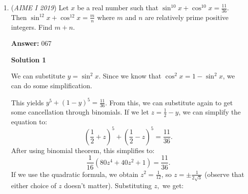 \begin{enumerate}
 Now before we move on to the next few simplification steps, we must remember that $gcd(a,b)$*$lcm(a,b)$=$a*b$.

 \begin{verbatim}
Due to the fact that these log's are in base $10$, this makes the first and second equation equal to $10^{60}$, $10^{570}$ respectively. In this step, we switched the log's into exponential form. Now we multiply both equations to get $x*y$*$(xy)^2$=($x^3$)($y^3$)=$10^{630}$. Now we take the cube root of both sides to get $xy=10^{210}$. 
\end{verbatim}

We've now gotten to the crucial part of this equation. Though this wouldn't pass for full points in a proof-based contest, this is AIME. So, we assume that $x<y$. We also let $x$=$10^a$ and $y$=$10^b$ That means that $gcd(x,y)$ is $x$ and the $lcm(x,y)$ is $y$ due to the fact that we are also assuming that both $x,y$ are $10^a$, $10^b$ respectively. 

 If we put our last few insights together into the first and second equation, we see that $x$=$10^{20}$. We also see that $y$=$10^{190}$. We could check these if wanted (don't worry they work), but if you were very limited on time for this question, just assume these values work and move on. 

 Now $10^{20}$ factors as $2^{20}$*$5^{20}$. This has $40$ prime factors. $2$, $20$ times and $5$, $20$ times. $10^{190}$ factors as $2^{190}$*$5^{190}$. This has $380$ prime factors. $2$, $190$ times and $5$, $190$ times. Now it's just $40*3+380*2=880$ as our final answer.

 -Schintalpati

 


	\item (\textit{AIME I 2019}) Let $x$ be a real number such that $\sin^{10}x+\cos^{10} x = \frac{11}{36}$. Then $\sin^{12}x+\cos^{12} x = \frac{m}{n}$ where $m$ and $n$ are relatively prime positive integers. Find $m+n$.


 
 \textbf{Answer: }067



\textbf{Solution 1}

We can substitute $y = \sin^2{x}$. Since we know that $\cos^2{x}=1-\sin^2{x}$, we can do some simplification. 

 This yields $y^5+(1-y)^5=\frac{11}{36}$. From this, we can substitute again to get some cancellation through binomials. If we let $z=\frac{1}{2}-y$, we can simplify the equation to:
 \[\left(\frac{1}{2}+z\right)^5+\left(\frac{1}{2}-z\right)^5=\frac{11}{36}.\] After using binomial theorem, this simplifies to:
 \[\frac{1}{16}(80z^4+40z^2+1)=\frac{11}{36}.\]If we use the quadratic formula, we obtain  $z^2=\frac{1}{12}$, so $z=\pm\frac{1}{2\sqrt{3}}$ (observe that either choice of $z$ doesn't matter). Substituting $z,$ we get:


\end{enumerate}
